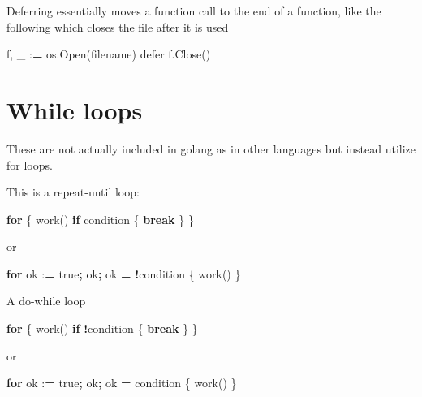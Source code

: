 \documentclass[]{book}
\newenvironment{Shaded}{\begin{snugshade}}{\end{snugshade}}
\newcommand{\ControlFlowTok}[1]{\textcolor[rgb]{0.13,0.29,0.53}{\textbf{#1}}}
\newcommand{\OperatorTok}[1]{\textcolor[rgb]{0.81,0.36,0.00}{\textbf{#1}}}
\newcommand{\NormalTok}[1]{#1}
\begin{document}
Deferring essentially moves a function call to the end of a function,
like the following which closes the file after it is used

\begin{Shaded}
\begin{Highlighting}[]
\NormalTok{f, _ :}\OperatorTok{=}\NormalTok{ os.Open(filename)}
\NormalTok{defer f.Close()}
\end{Highlighting}
\end{Shaded}

\section{While loops}\label{while-loops}

These are not actually included in golang as in other languages but
instead utilize for loops.

This is a repeat-until loop:

\begin{Shaded}
\begin{Highlighting}[]
\ControlFlowTok{for}\NormalTok{ \{}
\NormalTok{    work()}
    \ControlFlowTok{if}\NormalTok{ condition \{}
        \ControlFlowTok{break}
\NormalTok{    \}}
\NormalTok{\}}
\end{Highlighting}
\end{Shaded}

or

\begin{Shaded}
\begin{Highlighting}[]
\ControlFlowTok{for}\NormalTok{ ok :}\OperatorTok{=}\NormalTok{ true}\OperatorTok{;}\NormalTok{ ok}\OperatorTok{;}\NormalTok{ ok }\OperatorTok{=} \OperatorTok{!}\NormalTok{condition \{}
\NormalTok{    work()}
\NormalTok{\}}
\end{Highlighting}
\end{Shaded}

A do-while loop

\begin{Shaded}
\begin{Highlighting}[]
\ControlFlowTok{for}\NormalTok{ \{}
\NormalTok{    work()}
    \ControlFlowTok{if} \OperatorTok{!}\NormalTok{condition \{}
        \ControlFlowTok{break}
\NormalTok{    \}}
\NormalTok{\}}
\end{Highlighting}
\end{Shaded}

or

\begin{Shaded}
\begin{Highlighting}[]
\ControlFlowTok{for}\NormalTok{ ok :}\OperatorTok{=}\NormalTok{ true}\OperatorTok{;}\NormalTok{ ok}\OperatorTok{;}\NormalTok{ ok }\OperatorTok{=}\NormalTok{ condition \{}
\NormalTok{    work()}
\NormalTok{\}}
\end{Highlighting}
\end{Shaded}
\end{document}
